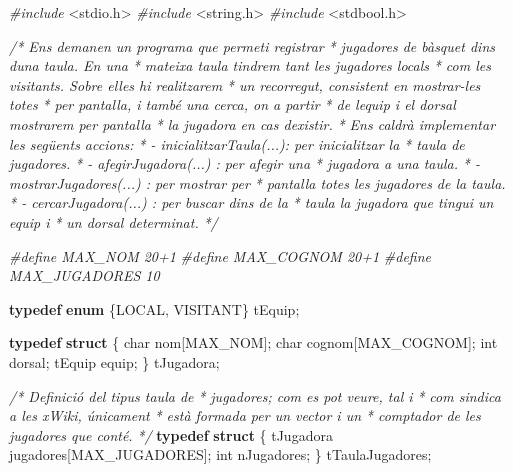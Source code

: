 \documentclass[
]{book}
\newenvironment{Shaded}{\begin{snugshade}}{\end{snugshade}}
\newcommand{\CommentTok}[1]{\textcolor[rgb]{0.56,0.35,0.01}{\textit{#1}}}
\newcommand{\DataTypeTok}[1]{\textcolor[rgb]{0.13,0.29,0.53}{#1}}
\newcommand{\ImportTok}[1]{#1}
\newcommand{\KeywordTok}[1]{\textcolor[rgb]{0.13,0.29,0.53}{\textbf{#1}}}
\newcommand{\NormalTok}[1]{#1}
\newcommand{\PreprocessorTok}[1]{\textcolor[rgb]{0.56,0.35,0.01}{\textit{#1}}}
\begin{document}
\begin{Shaded}
\begin{Highlighting}[]
\PreprocessorTok{\#include }\ImportTok{\textless{}stdio.h\textgreater{}}
\PreprocessorTok{\#include }\ImportTok{\textless{}string.h\textgreater{}}
\PreprocessorTok{\#include }\ImportTok{\textless{}stdbool.h\textgreater{}}

\CommentTok{/* Ens demanen un programa que permeti registrar}
\CommentTok{ * jugadores de bàsquet dins d\textquotesingle{}una taula. En una}
\CommentTok{ * mateixa taula tindrem tant les jugadores locals}
\CommentTok{ * com les visitants. Sobre elles hi realitzarem}
\CommentTok{ * un recorregut, consistent en mostrar{-}les totes}
\CommentTok{ * per pantalla, i també una cerca, on a partir }
\CommentTok{ * de l\textquotesingle{}equip i el dorsal mostrarem per pantalla}
\CommentTok{ * la jugadora en cas d\textquotesingle{}existir.}
\CommentTok{ * Ens caldrà implementar les següents accions:}
\CommentTok{ * {-} inicialitzarTaula(...): per inicialitzar la}
\CommentTok{ *   taula de jugadores.}
\CommentTok{ * {-} afegirJugadora(...) : per afegir una}
\CommentTok{ *   jugadora a una taula.}
\CommentTok{ * {-} mostrarJugadores(...) : per mostrar per }
\CommentTok{ *   pantalla totes les jugadores de la taula.}
\CommentTok{ * {-} cercarJugadora(...) : per buscar dins de la}
\CommentTok{ *   taula la jugadora que tingui un equip i }
\CommentTok{ *   un dorsal determinat.}
\CommentTok{ */}
 
\PreprocessorTok{\#define MAX\_NOM 20+1}
\PreprocessorTok{\#define MAX\_COGNOM 20+1}
\PreprocessorTok{\#define MAX\_JUGADORES 10}

\KeywordTok{typedef} \KeywordTok{enum}\NormalTok{ \{LOCAL, VISITANT\} tEquip;}

\KeywordTok{typedef} \KeywordTok{struct}\NormalTok{ \{}
    \DataTypeTok{char}\NormalTok{ nom[MAX\_NOM];}
    \DataTypeTok{char}\NormalTok{ cognom[MAX\_COGNOM];}
    \DataTypeTok{int}\NormalTok{ dorsal;}
\NormalTok{    tEquip equip;}
\NormalTok{\} tJugadora;}

\CommentTok{/* Definició del tipus taula de}
\CommentTok{ * jugadores; com es pot veure, tal i }
\CommentTok{ * com s\textquotesingle{}indica a les xWiki, únicament}
\CommentTok{ * està formada per un vector i un }
\CommentTok{ * comptador de les jugadores que conté.}
\CommentTok{ */}
\KeywordTok{typedef} \KeywordTok{struct}\NormalTok{ \{}
\NormalTok{    tJugadora jugadores[MAX\_JUGADORES];}
    \DataTypeTok{int}\NormalTok{ nJugadores;}
\NormalTok{\} tTaulaJugadores;}


\end{Highlighting}
\end{Shaded}
\end{document}
